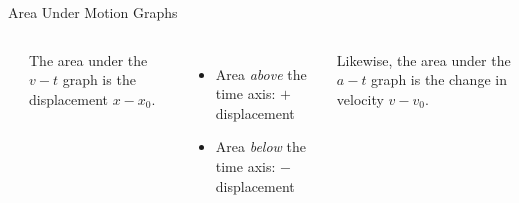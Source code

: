 \documentclass[12pt,compress,aspectratio=169,dvipsnames]{beamer}
\begin{document}
\begin{frame}{Area Under Motion Graphs}
  \begin{columns}
    \begin{center}
    \end{center}
    
    The area under the $v-t$ graph is the displacement $x-x_0$.
    \begin{itemize}
    \item Area {\color{blue!20}\emph{above}} the time axis: $+$
      displacement
    \item Area {\color{red!40}\emph{below}} the time axis: $-$ displacement
    \end{itemize}
    \vspace{.2in}Likewise, the area under the $a-t$ graph is the change in
    velocity $v-v_0$.
  \end{columns}
\end{frame}
\end{document}
